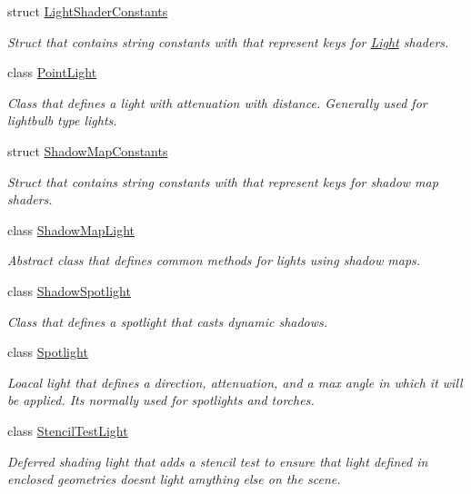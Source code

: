 \begin{DoxyCompactItemize}
struct \mbox{\hyperlink{struct_geometry_engine_1_1_geometry_world_item_1_1_geometry_light_1_1_light_shader_constants}{Light\+Shader\+Constants}}
\begin{DoxyCompactList}\small\item\em Struct that contains string constants with that represent keys for \mbox{\hyperlink{class_geometry_engine_1_1_geometry_world_item_1_1_geometry_light_1_1_light}{Light}} shaders. \end{DoxyCompactList}\item 
class \mbox{\hyperlink{class_geometry_engine_1_1_geometry_world_item_1_1_geometry_light_1_1_point_light}{Point\+Light}}
\begin{DoxyCompactList}\small\item\em Class that defines a light with attenuation with distance. Generally used for lightbulb type lights. \end{DoxyCompactList}\item 
struct \mbox{\hyperlink{struct_geometry_engine_1_1_geometry_world_item_1_1_geometry_light_1_1_shadow_map_constants}{Shadow\+Map\+Constants}}
\begin{DoxyCompactList}\small\item\em Struct that contains string constants with that represent keys for shadow map shaders. \end{DoxyCompactList}\item 
class \mbox{\hyperlink{class_geometry_engine_1_1_geometry_world_item_1_1_geometry_light_1_1_shadow_map_light}{Shadow\+Map\+Light}}
\begin{DoxyCompactList}\small\item\em Abstract class that defines common methods for lights using shadow maps. \end{DoxyCompactList}\item 
class \mbox{\hyperlink{class_geometry_engine_1_1_geometry_world_item_1_1_geometry_light_1_1_shadow_spotlight}{Shadow\+Spotlight}}
\begin{DoxyCompactList}\small\item\em Class that defines a spotlight that casts dynamic shadows. \end{DoxyCompactList}\item 
class \mbox{\hyperlink{class_geometry_engine_1_1_geometry_world_item_1_1_geometry_light_1_1_spotlight}{Spotlight}}
\begin{DoxyCompactList}\small\item\em Loacal light that defines a direction, attenuation, and a max angle in which it will be applied. It\textquotesingle{}s normally used for spotlights and torches. \end{DoxyCompactList}\item 
class \mbox{\hyperlink{class_geometry_engine_1_1_geometry_world_item_1_1_geometry_light_1_1_stencil_test_light}{Stencil\+Test\+Light}}
\begin{DoxyCompactList}\small\item\em Deferred shading light that adds a stencil test to ensure that light defined in enclosed geometries doesn\textquotesingle{}t light amything else on the scene. \end{DoxyCompactList}\end{DoxyCompactItemize}
